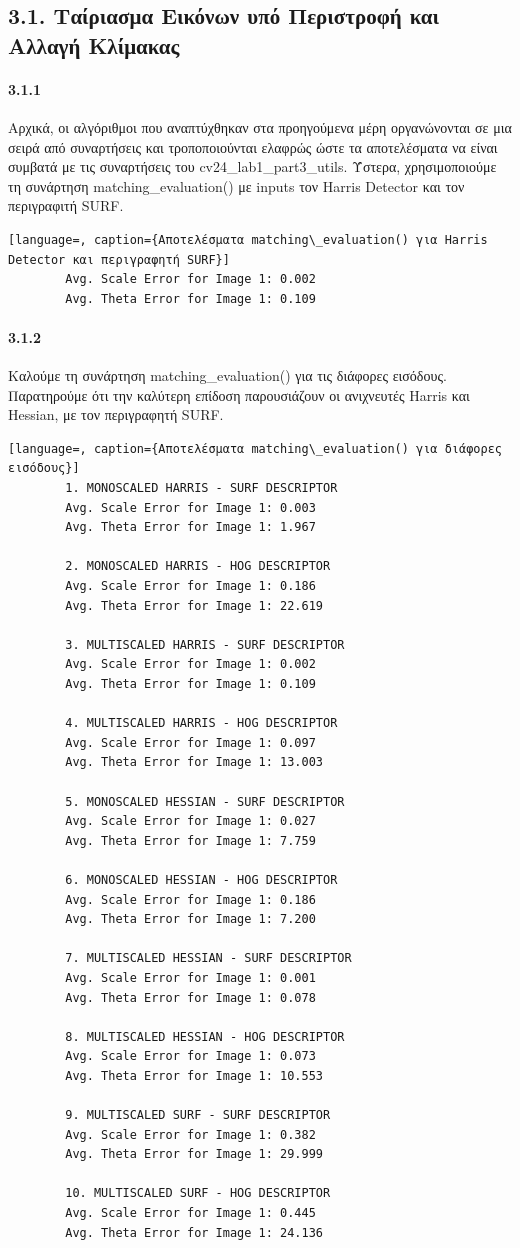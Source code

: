 \documentclass[]{article}
\begin{document}
	\subsection*{3.1. Ταίριασμα Εικόνων υπό Περιστροφή και Αλλαγή Κλίμακας}
	\paragraph{3.1.1} Αρχικά, οι αλγόριθμοι που αναπτύχθηκαν στα προηγούμενα μέρη οργανώνονται σε μια σειρά από συναρτήσεις και τροποποιούνται ελαφρώς ώστε τα αποτελέσματα να είναι συμβατά με τις συναρτήσεις του cv24\_lab1\_part3\_utils. Ύστερα, χρησιμοποιούμε τη συνάρτηση matching\_evaluation() με inputs τον Harris Detector και τον περιγραφιτή SURF.
	\begin{lstlisting}[language=, caption={Αποτελέσματα matching\_evaluation() για Harris Detector και περιγραφητή SURF}]
		Avg. Scale Error for Image 1: 0.002
		Avg. Theta Error for Image 1: 0.109
	\end{lstlisting}
	
	\paragraph{3.1.2} Καλούμε τη συνάρτηση matching\_evaluation() για τις διάφορες εισόδους. Παρατηρούμε ότι την καλύτερη επίδοση παρουσιάζουν οι ανιχνευτές Harris και Hessian, με τον περιγραφητή SURF.
	
	\begin{lstlisting}[language=, caption={Αποτελέσματα matching\_evaluation() για διάφορες εισόδους}]
		1. MONOSCALED HARRIS - SURF DESCRIPTOR
		Avg. Scale Error for Image 1: 0.003
		Avg. Theta Error for Image 1: 1.967
		
		2. MONOSCALED HARRIS - HOG DESCRIPTOR
		Avg. Scale Error for Image 1: 0.186
		Avg. Theta Error for Image 1: 22.619
		
		3. MULTISCALED HARRIS - SURF DESCRIPTOR
		Avg. Scale Error for Image 1: 0.002
		Avg. Theta Error for Image 1: 0.109
		
		4. MULTISCALED HARRIS - HOG DESCRIPTOR
		Avg. Scale Error for Image 1: 0.097
		Avg. Theta Error for Image 1: 13.003
		
		5. MONOSCALED HESSIAN - SURF DESCRIPTOR
		Avg. Scale Error for Image 1: 0.027
		Avg. Theta Error for Image 1: 7.759
		
		6. MONOSCALED HESSIAN - HOG DESCRIPTOR
		Avg. Scale Error for Image 1: 0.186
		Avg. Theta Error for Image 1: 7.200
		
		7. MULTISCALED HESSIAN - SURF DESCRIPTOR
		Avg. Scale Error for Image 1: 0.001
		Avg. Theta Error for Image 1: 0.078
		
		8. MULTISCALED HESSIAN - HOG DESCRIPTOR
		Avg. Scale Error for Image 1: 0.073
		Avg. Theta Error for Image 1: 10.553
		
		9. MULTISCALED SURF - SURF DESCRIPTOR
		Avg. Scale Error for Image 1: 0.382
		Avg. Theta Error for Image 1: 29.999
		
		10. MULTISCALED SURF - HOG DESCRIPTOR
		Avg. Scale Error for Image 1: 0.445
		Avg. Theta Error for Image 1: 24.136
	\end{lstlisting}
	
\end{document}
